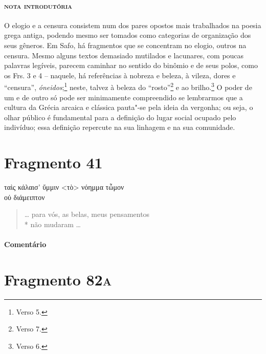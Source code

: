\vspace*{-3\baselineskip}

\paragraph{\textsc{nota introdutória}}
O elogio e a censura consistem num dos pares opostos mais trabalhados na poesia
grega antiga, podendo mesmo ser tomados como categorias de organização dos seus gêneros.
Em Safo, há fragmentos que se concentram no
elogio, outros na
censura. Mesmo alguns textos demasiado mutilados e lacunares, com poucas palavras legíveis, parecem caminhar no sentido do binômio e de seus polos, como os Frs. 3 e 4 -- naquele, há referências à nobreza e beleza, à vileza, dores e ``censura'', \textit{óneidos};\footnote{Verso 5.} neste, talvez à beleza do ``rosto''\footnote{Verso 7.} e ao brilho.\footnote{Verso 6.} O poder de um e de outro só pode ser
minimamente compreendido se lembrarmos que a cultura da Grécia arcaica e
clássica pauta"-se pela ideia da vergonha; ou seja, o olhar público é
fundamental para a definição do lugar social ocupado pelo indivíduo; essa
definição repercute na sua linhagem e na sua comunidade. 

\section{Fragmento 41}

\begin{gkverse}
ταὶς κάλαισ’ ὔμμιν <τὸ> νόημμα τὦμον\\
       οὐ διάμειπτον
\end{gkverse}

\begin{verse}
\ldots{} para vós, as belas, meus pensamentos\\*
não mudaram \ldots{}
\end{verse}

\medskip

\paragraph{Comentário} 


\section{Fragmento 82\textsc{a}}

